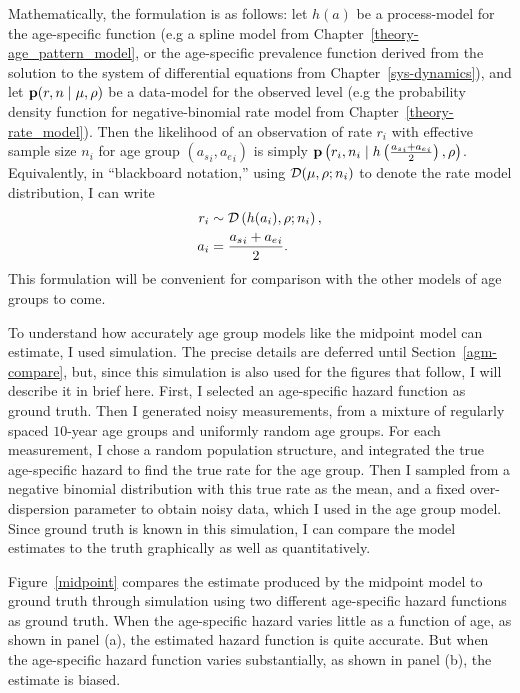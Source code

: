 Mathematically, the formulation is as follows: let $h(a)$ be a
process-model for the age-specific function (e.g a spline model
from Chapter~\ref{theory-age_pattern_model}, or the age-specific prevalence function derived from the solution to the system of differential equations from Chapter~\ref{sys-dynamics}), and let $\mathbf{p}(r,n\;|\;
\mu,\rho)$ be a data-model for the observed level (e.g the probability
density function for negative-binomial rate model from
Chapter~\ref{theory-rate_model}).
Then the likelihood of an observation of rate $r_i$ with effective
sample size $n_i$ for age group $({a_s}_i, {a_e}_i)$ is simply
$\mathbf{p}\left(r_i, n_i \;|\; h\left(\frac{{a_s}_i+{a_e}_i}{2}\right),
\rho\right)$. Equivalently, in ``blackboard notation,'' using
$\mathcal{D}(\mu, \rho; n_i)$ to denote the rate model distribution, I can
write
\begin{align*}
r_i &\sim \mathcal{D}\left(h(a_i), \rho; n_i\right),\\
a_i &= \frac{{a_s}_i+{a_e}_i}{2}.
\end{align*}
This formulation will be convenient for comparison with the other models of age groups to come.

To understand how accurately age group models like the midpoint model
can estimate, I used simulation.  The precise details are deferred
until Section~\ref{agm-compare}, but, since this simulation is also used for the
figures that follow, I will describe it in brief here.  First, I
selected an age-specific hazard function as ground truth.  Then I
generated noisy measurements, from a mixture of regularly spaced
$10$-year age groups and uniformly random age groups.  For each
measurement, I chose a random population structure, and integrated the
true age-specific hazard to find the true rate for the age group.
Then I sampled from a negative binomial distribution with this true
rate as the mean, and a fixed over-dispersion parameter to obtain noisy
data, which I used in the age group model.  Since ground truth is
known in this simulation, I can compare the model estimates to the
truth graphically as well as quantitatively.

Figure~\ref{midpoint} compares the estimate produced by the midpoint
model to ground truth through simulation using two different
age-specific hazard functions as ground truth.  When the age-specific
hazard varies little as a function of age, as shown in panel (a), the
estimated hazard function is quite accurate.  But when the age-specific hazard function
varies substantially, as shown in panel (b), the estimate is biased.



